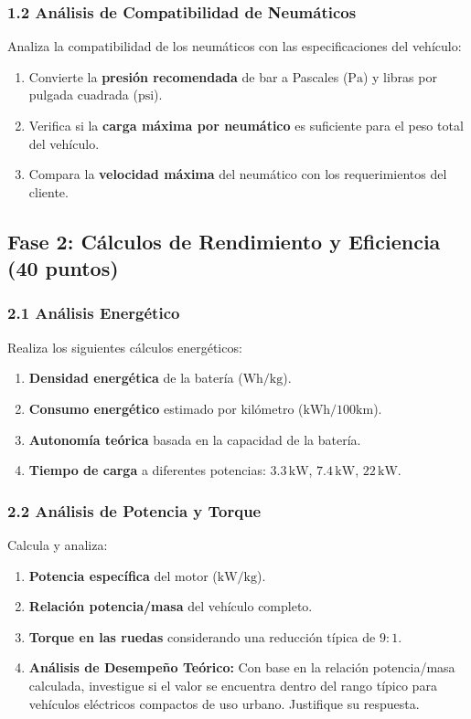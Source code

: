 \documentclass{article}
\begin{document}
\subsubsection*{1.2 Análisis de Compatibilidad de Neumáticos}
Analiza la compatibilidad de los neumáticos con las especificaciones del vehículo:
\begin{enumerate}
    \item Convierte la \textbf{presión recomendada} de bar a Pascales ($\text{Pa}$) y libras por pulgada cuadrada ($\text{psi}$).
    \item Verifica si la \textbf{carga máxima por neumático} es suficiente para el peso total del vehículo.
    \item Compara la \textbf{velocidad máxima} del neumático con los requerimientos del cliente.
\end{enumerate}

\subsection*{Fase 2: Cálculos de Rendimiento y Eficiencia (40 puntos)}

\subsubsection*{2.1 Análisis Energético}
Realiza los siguientes cálculos energéticos:
\begin{enumerate}
    \item \textbf{Densidad energética} de la batería ($\text{Wh/kg}$).
    \item \textbf{Consumo energético} estimado por kilómetro ($\text{kWh/100km}$).
    \item \textbf{Autonomía teórica} basada en la capacidad de la batería.
    \item \textbf{Tiempo de carga} a diferentes potencias: $3.3 \, \text{kW}$, $7.4 \, \text{kW}$, $22 \, \text{kW}$.
\end{enumerate}

\subsubsection*{2.2 Análisis de Potencia y Torque}
Calcula y analiza:
\begin{enumerate}
    \item \textbf{Potencia específica} del motor ($\text{kW/kg}$).
    \item \textbf{Relación potencia/masa} del vehículo completo.
    \item \textbf{Torque en las ruedas} considerando una reducción típica de $9:1$.
    \item \textbf{Análisis de Desempeño Teórico:} Con base en la relación potencia/masa calculada, investigue si el valor se encuentra dentro del rango típico para vehículos eléctricos compactos de uso urbano. Justifique su respuesta.
\end{enumerate}
\end{document}
